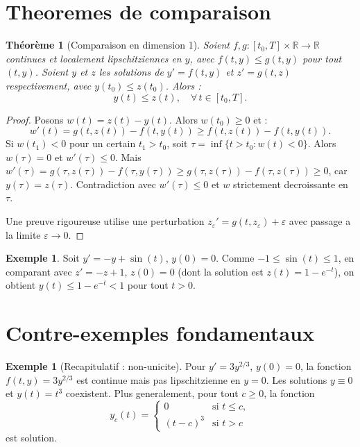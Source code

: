 \documentclass[12pt,a4paper,openany]{book}
\theoremstyle{definition}
\newtheorem{exemple}[definition]{Exemple}
\theoremstyle{plain}
\newtheorem{theoreme}[definition]{Théorème}
\theoremstyle{remark}
\newcommand{\R}{\mathbb{R}}
\begin{document}
\section{Theoremes de comparaison}\label{sec:comparaison}

\begin{theoreme}[Comparaison en dimension 1]\label{thm:comparaison}
Soient $f, g : [t_0, T] \times \R \to \R$ continues et localement lipschitziennes en $y$, avec $f(t, y) \leq g(t, y)$ pour tout $(t, y)$. Soient $y$ et $z$ les solutions de $y' = f(t, y)$ et $z' = g(t, z)$ respectivement, avec $y(t_0) \leq z(t_0)$. Alors :
\[
  y(t) \leq z(t), \quad \forall\, t \in [t_0, T].
\]
\end{theoreme}

\begin{proof}
Posons $w(t) = z(t) - y(t)$. Alors $w(t_0) \geq 0$ et :
\[
  w'(t) = g(t, z(t)) - f(t, y(t)) \geq f(t, z(t)) - f(t, y(t)).
\]
Si $w(t_1) < 0$ pour un certain $t_1 > t_0$, soit $\tau = \inf\{t > t_0 : w(t) < 0\}$. Alors $w(\tau) = 0$ et $w'(\tau) \leq 0$. Mais $w'(\tau) = g(\tau, z(\tau)) - f(\tau, y(\tau)) \geq g(\tau, z(\tau)) - f(\tau, z(\tau)) \geq 0$, car $y(\tau) = z(\tau)$. Contradiction avec $w'(\tau) \leq 0$ et $w$ strictement decroissante en $\tau$.

Une preuve rigoureuse utilise une perturbation $z_\varepsilon' = g(t, z_\varepsilon) + \varepsilon$ avec passage a la limite $\varepsilon \to 0$.
\end{proof}

\begin{exemple}\label{ex:comparaison}
Soit $y' = -y + \sin(t)$, $y(0) = 0$. Comme $-1 \leq \sin(t) \leq 1$, en comparant avec $z' = -z + 1$, $z(0) = 0$ (dont la solution est $z(t) = 1 - e^{-t}$), on obtient $y(t) \leq 1 - e^{-t} < 1$ pour tout $t > 0$.
\end{exemple}

\section{Contre-exemples fondamentaux}\label{sec:contre-exemples}

\begin{exemple}[Recapitulatif : non-unicite]\label{ex:recap-non-unicite}
Pour $y' = 3 y^{2/3}$, $y(0) = 0$, la fonction $f(t,y) = 3y^{2/3}$ est continue mais pas lipschitzienne en $y = 0$. Les solutions $y \equiv 0$ et $y(t) = t^3$ coexistent. Plus generalement, pour tout $c \geq 0$, la fonction
\[
  y_c(t) = \begin{cases} 0 & \text{si } t \leq c, \\ (t - c)^3 & \text{si } t > c \end{cases}
\]
est solution.
\end{exemple}
\end{document}

